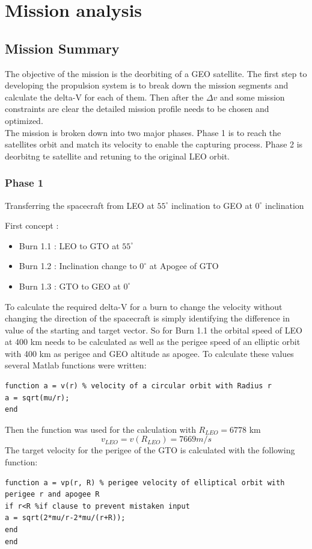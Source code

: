 \chapter{Mission analysis }
\section{Mission Summary}
The objective of the mission is the deorbiting of a GEO satellite. The first step to developing the
propulsion system is to break down the mission segments and calculate the delta-V for each of them.
Then after the $\Delta v$ and some mission constraints are clear the detailed mission profile needs to be chosen and optimized.\\

The mission is broken down into two major phases. Phase 1 is to reach the satellites orbit and match its
velocity to enable the capturing process. Phase 2 is deorbitng te satellite and retuning to the original LEO orbit.
\subsection{Phase 1}
\begin{center}
	Transferring the spacecraft from LEO at $55^\circ$ inclination to GEO at $0^\circ$ inclination
\end{center}
First concept : \\

\begin{itemize}
	\item Burn 1.1 : LEO to GTO at $55^\circ$
	\item Burn 1.2 : Inclination change to $0^\circ$ at Apogee of GTO
	\item Burn 1.3 : GTO to GEO at $0^\circ$
\end{itemize}
To calculate the required delta-V for a burn to change the velocity without changing the direction of the spacecraft is simply identifying the difference in value of the starting and target vector. So for Burn 1.1 the orbital speed of LEO at 400 km needs to be calculated as well as the perigee speed of an elliptic orbit with 400 km as perigee and GEO altitude as apogee. To calculate these values several Matlab functions were written:

\begin{verbatim}
function a = v(r) % velocity of a circular orbit with Radius r
a = sqrt(mu/r);
end
\end{verbatim}
Then the function was used for the calculation with $R_{LEO} = 6778$ km
\begin{equation}
	v_{LEO} = v(R_{LEO}) = 7669 m/s
\end{equation}
The target velocity for the perigee of the GTO is calculated with the following function:
\begin{verbatim}
function a = vp(r, R) % perigee velocity of elliptical orbit with perigee r and apogee R
if r<R %if clause to prevent mistaken input
a = sqrt(2*mu/r-2*mu/(r+R));
end
end
\end{verbatim}

